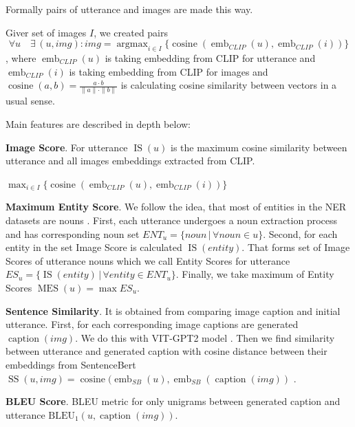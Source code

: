 Formally pairs of utterance and images are made this way.

Giver set of images $I$, we created pairs $$\forall u \quad \exists \, (u,img): img = \operatorname{argmax}_{i \in I} \{\operatorname{cosine}(\operatorname{emb}_{CLIP}(u), \operatorname{emb}_{CLIP}(i))\}$$, where $\operatorname{emb}_{CLIP}(u)$ is taking embedding from CLIP for utterance and $\operatorname{emb}_{CLIP}(i)$ is taking embedding from CLIP for images and $\operatorname{cosine}(a,b) = \frac{a \cdot b}{ \| a \| \cdot \| b\|}$ is calculating cosine similarity between vectors in a usual sense.

Main features are described in depth below:

\textbf{Image Score}. For utterance $\operatorname{IS}(u)$ is the maximum cosine similarity between utterance and all images embeddings extracted from CLIP. 

$\displaystyle\max_{i \in I} \{\operatorname{cosine}(\operatorname{emb}_{CLIP}(u), \operatorname{emb}_{CLIP}(i))\}$

\smallskip

\textbf{Maximum Entity Score}. We follow the idea, that most of entities in the NER datasets are nouns \cite{Noun-based}. First, each utterance undergoes a noun extraction process and has corresponding noun set $ENT_u = \{noun \, | \, \forall noun \in u \}$.  Second, for each entity in the set Image Score is calculated $\operatorname{IS}(entity)$. That forms set of Image Scores of utterance nouns which we call Entity Scores for utterance $ES_u = \{\operatorname{IS}(entity) \, | \, \forall entity \in ENT_u \}$. Finally, we take maximum of Entity Scores $\operatorname{MES}(u) = \max ES_u$.

\smallskip

\textbf{Sentence Similarity}. It is obtained from comparing image caption and initial utterance. First, for each corresponding image captions are generated $\operatorname{caption}(img)$. We do this with VIT-GPT2 model \cite{kumar2022imagecaptioning}. Then we find similarity between utterance and generated caption with cosine distance between their embeddings from SentenceBert $\operatorname{SS}(u,img) = \operatorname{cosine}(\operatorname{emb}_{SB}(u), \operatorname{emb}_{SB}(\operatorname{caption}(img))$ \cite{reimers-2019-sentence-bert} . 

\smallskip

\textbf{BLEU Score}. BLEU \cite{bleu} metric for only unigrams between generated caption and utterance $\operatorname{BLEU_1}(u, \operatorname{caption}(img))$.

